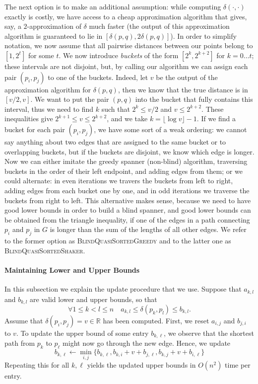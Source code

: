 \documentclass[a4paper,USenglish]{socg-lipics-v2018}
\newcommand{\R}{\mathbb{R}}
\newcommand{\dist}{\delta}
\begin{document}
The next option is to make an additional assumption: while
computing $\dist(\cdot, \cdot)$ exactly is costly, we have access to a cheap approximation algorithm
that gives, say, a $2$-approximation of $\dist$ much faster (the output of this approximation algorithm is guaranteed to
lie in $[\dist(p,q), 2 \dist(p,q)]$). In order to simplify notation, we now assume
that all pairwise distances between our points belong to $[1, 2^t]$ for some $t$.
We now introduce \textit{buckets} of the form $[2^k, 2^{k+2}]$ for $k = 0 \dots t$;
these intervals are not disjoint, but, by calling our algorithm we can assign
each pair $(p_i, p_j)$ to one of the buckets.
Indeed, let $v$ be the output of the approximation algorithm for $\dist(p,q)$,
then we know that the true distance is in $[v/2, v]$. We want to put the pair $(p,q)$ into the bucket
that fully contains this interval, thus we need to find $k$ such that
$2^k \leq v /2$ and $v \leq 2^{k+2}$. These inequalities give $ 2^{k+1} \leq v \leq 2^{k+2}$,
and we take $k = \lfloor \log v \rfloor - 1$.
If we find a bucket for each pair $(p_i, p_j)$, we have some sort of a weak ordering: we cannot say anything
about two edges that are assigned to the same bucket or to overlapping buckets, but if the buckets
are disjoint, we know which edge is longer. Now we can either imitate the greedy spanner (non-blind) algorithm,
traversing buckets in the order of their left endpoint, and adding edges from them; or we could alternate: in even iterations
we travers the buckets from left to right, adding edges from each bucket one by one, and in odd iterations
we traverse the buckets from right to left. This alternative makes sense, because we need to have good lower bounds in
order to build a blind spanner, and good lower bounds can be obtained from the triangle inequality, if one of the edges 
in a path connecting $p_i$ and $p_j$ in $G$ is longer than the sum of the lengths of all other edges.
We refer to the former option as \textsc{BlindQuasiSortedGreedy} and to the latter one as \textsc{BlindQuasiSortedShaker}.


 \paragraph{Maintaining Lower and Upper Bounds}

 In this subsection we explain the update procedure that we use. Suppose that
 $a_{k,l}$ and $b_{k,l}$ are valid lower and upper bounds, so that
\[
     \forall 1 \leq k < l \leq n \quad a_{k,l} \leq \dist(p_k, p_l) \leq b_{k,l}.
\]
Assume that $\dist(p_i,p_j)=v\in\R$ has been computed.
First, we reset $a_{i,j}$ and $b_{j,i}$ to $v$. 
To update the upper bound of some entry $b_{k,\ell}$,
we observe that the shortest path from $p_k$ to $p_\ell$ might now
go through the new edge. Hence, we update
\[
    b_{k,\ell}\gets \min_{i,j}\{b_{k,\ell},b_{k,i}+v+b_{j,\ell},b_{k,j}+v+b_{i,\ell}\}
\]
Repeating this for all $k,\ell$ yields the updated upper bounds in $O(n^2)$
time per entry.
\end{document}
